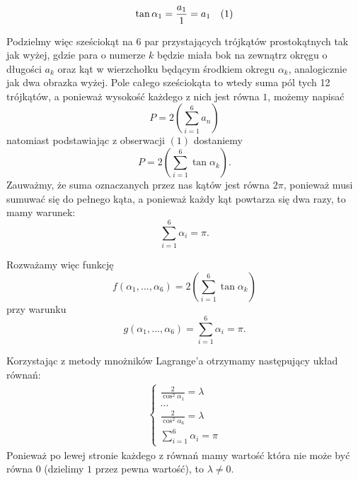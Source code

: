 \documentclass{article}[13pt]
\begin{document}
    \begin{center}
        \end{center}
        $$\tan\alpha_1={a_1\over 1}=a_1\quad (1)$$

        Podzielmy więc sześciokąt na 6 par przystających trójkątów prostokątnych tak jak wyżej, gdzie para o numerze $k$ będzie miała bok na zewnątrz okręgu o długości $a_k$ oraz kąt w wierzchołku będącym środkiem okregu $\alpha_k$, analogicznie jak dwa obrazka wyżej. Pole całego sześciokąta to wtedy suma pól tych 12 trójkątów, a ponieważ wysokość każdego z nich jest równa $1$, możemy napisać
        $$P=2(\sum\limits_{i=1}^6 a_n)$$
        natomiast podstawiając z obserwacji $(1)$ dostaniemy
        $$P=2(\sum\limits_{i=1}^6\tan\alpha_k).$$
        Zauważmy, że suma oznaczanych przez nas kątów jest równa $2\pi$, ponieważ musi sumuwać się do pełnego kąta, a ponieważ każdy kąt powtarza się dwa razy, to mamy warunek:
        $$\sum\limits_{i=1}^6\alpha_i=\pi.$$

        Rozważamy więc funkcję 
        $$f(\alpha_1,...,\alpha_6)=2(\sum\limits_{i=1}^6\tan\alpha_k)$$
        przy warunku
        $$g(\alpha_1,...,\alpha_6)=\sum\limits_{i=1}^6\alpha_i=\pi.$$

        Korzystając z metody mnożników Lagrange'a otrzymamy następujący układ równań:
        \begin{align*}
            \begin{cases}
                \frac2{\cos^2 \alpha_1}=\lambda\\
                ...\\
                \frac2{\cos^2\alpha_6}=\lambda\\
                \sum\limits_{i=1}^6\alpha_i=\pi
            \end{cases}
        \end{align*}
        Ponieważ po lewej stronie każdego z równań mamy wartość która nie może być równa $0$ (dzielimy $1$ przez pewna wartość), to $\lambda\neq 0$.\smallskip\\
\end{document}
